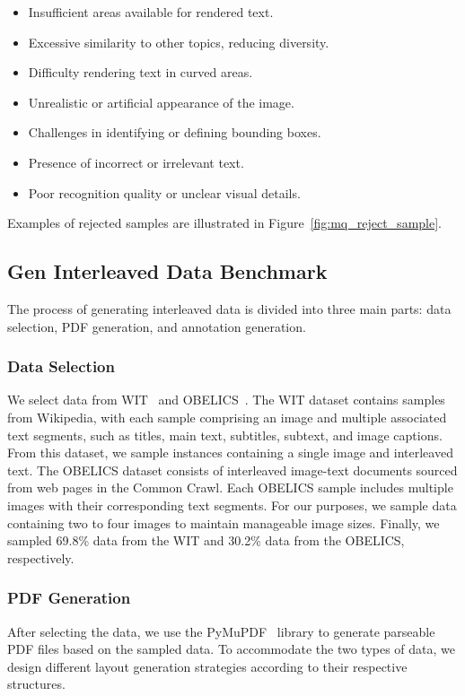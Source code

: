 \begin{itemize}
    \item Insufficient areas available for rendered text.
    \item Excessive similarity to other topics, reducing diversity.
    \item Difficulty rendering text in curved areas.
    \item Unrealistic or artificial appearance of the image.
    \item Challenges in identifying or defining bounding boxes.
    \item Presence of incorrect or irrelevant text.
    \item Poor recognition quality or unclear visual details.
\end{itemize}

Examples of rejected samples are illustrated in Figure~\ref{fig:mq_reject_sample}.




\subsection{Gen Interleaved Data Benchmark}
\label{sec:interleave}
The process of generating interleaved data is divided into three main parts: data selection, PDF generation, and annotation generation.
\subsubsection{Data Selection}
We select data from WIT~\cite{wit} and OBELICS~\cite{obelics}. 
The WIT dataset contains samples from Wikipedia, with each sample comprising an image and multiple associated text segments, such as titles, main text, subtitles, subtext, and image captions. From this dataset, we sample instances containing a single image and interleaved text. 
The OBELICS dataset consists of interleaved image-text documents sourced from web pages in the Common Crawl. Each OBELICS sample includes multiple images with their corresponding text segments. For our purposes, we sample data containing two to four images to maintain manageable image sizes. 
Finally, we sampled 69.8\% data from the WIT and 30.2\% data from the OBELICS, respectively.
\subsubsection{PDF Generation}
After selecting the data, we use the PyMuPDF~\cite{pymupdf} library to generate parseable PDF files based on the sampled data. To accommodate the two types of data, we design different layout generation strategies according to their respective structures.

